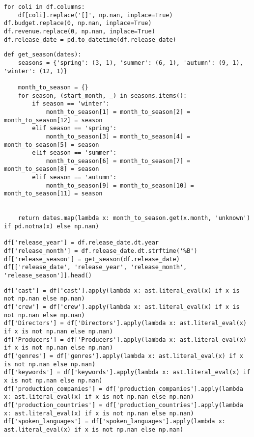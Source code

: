 \begin{lstlisting}
for coli in df.columns:
    df[coli].replace('[]', np.nan, inplace=True)
df.budget.replace(0, np.nan, inplace=True)
df.revenue.replace(0, np.nan, inplace=True)
df.release_date = pd.to_datetime(df.release_date)
\end{lstlisting}

\begin{lstlisting}
def get_season(dates):
    seasons = {'spring': (3, 1), 'summer': (6, 1), 'autumn': (9, 1), 'winter': (12, 1)}
    
    month_to_season = {}
    for season, (start_month, _) in seasons.items():
        if season == 'winter':
            month_to_season[1] = month_to_season[2] = month_to_season[12] = season
        elif season == 'spring':
            month_to_season[3] = month_to_season[4] = month_to_season[5] = season
        elif season == 'summer':
            month_to_season[6] = month_to_season[7] = month_to_season[8] = season
        elif season == 'autumn':
            month_to_season[9] = month_to_season[10] = month_to_season[11] = season
            
    
    return dates.map(lambda x: month_to_season.get(x.month, 'unknown') if pd.notna(x) else np.nan)

df['release_year'] = df.release_date.dt.year
df['release_month'] = df.release_date.dt.strftime('%B')
df['release_season'] = get_season(df.release_date)
df[['release_date', 'release_year', 'release_month', 'release_season']].head()
\end{lstlisting}

\begin{lstlisting}
df['cast'] = df['cast'].apply(lambda x: ast.literal_eval(x) if x is not np.nan else np.nan)
df['crew'] = df['crew'].apply(lambda x: ast.literal_eval(x) if x is not np.nan else np.nan)
df['Directors'] = df['Directors'].apply(lambda x: ast.literal_eval(x) if x is not np.nan else np.nan)
df['Producers'] = df['Producers'].apply(lambda x: ast.literal_eval(x) if x is not np.nan else np.nan)
df['genres'] = df['genres'].apply(lambda x: ast.literal_eval(x) if x is not np.nan else np.nan)
df['keywords'] = df['keywords'].apply(lambda x: ast.literal_eval(x) if x is not np.nan else np.nan)
df['production_companies'] = df['production_companies'].apply(lambda x: ast.literal_eval(x) if x is not np.nan else np.nan)
df['production_countries'] = df['production_countries'].apply(lambda x: ast.literal_eval(x) if x is not np.nan else np.nan)
df['spoken_languages'] = df['spoken_languages'].apply(lambda x: ast.literal_eval(x) if x is not np.nan else np.nan)
\end{lstlisting}

